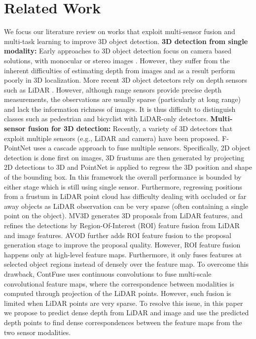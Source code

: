 \documentclass[10pt,twocolumn,letterpaper]{article}
\newcommand{\bd}[1]{\textbf{#1}}
\begin{document}
 \section{Related Work}
We focus our literature review on works that exploit multi-sensor fusion and multi-task learning to improve 3D object detection.
\newline
\newline
\bd{3D detection from single modality:}
Early approaches to 3D object detection focus on camera based solutions, with monocular or stereo images \cite{3dop, mono3d}. However, they suffer from the inherent difficulties of estimating depth from images  and as a result  perform poorly in 3D localization. More recent  3D object detectors rely on depth sensors such as  LiDAR \cite{pixor, voxelnet}. However, although range sensors provide precise depth measurements,  the observations are usually  sparse (particularly at long range) and lack the information richness of  images. It is thus difficult to distinguish classes such as pedestrian and bicyclist with LiDAR-only detectors. 
\newline
\newline
\bd{Multi-sensor fusion for 3D detection:}
Recently, a variety of 3D detectors that exploit  multiple sensors (e.g., LiDAR and camera) have been proposed. 
F-PointNet \cite{fpointnet} uses a cascade approach to fuse multiple sensors. Specifically, 2D object detection is done first on images, 3D frustums are then generated by projecting 2D detections to 3D and PointNet \cite{pointnet, pointnet2} is applied to regress the 3D position and shape of the bounding box. In this framework the overall performance is bounded by either stage which is still using single sensor. Furthermore, regressing positions from a frustum in LiDAR point cloud has difficulty dealing with occluded or far away objects as LiDAR observation can be very sparse (often containing a single point on the object). 
MV3D \cite{mv3d} generates 3D proposals from LiDAR features, and refines the detections by Region-Of-Interest (ROI) feature fusion from LiDAR and image features. AVOD \cite{avod} further adds ROI feature fusion to the proposal generation stage to improve the proposal quality. However, ROI feature fusion happens only  at high-level feature maps. Furthermore,  it only fuses features at selected object regions instead of densely over the feature map. To overcome this drawback, ContFuse \cite{contfuse}  uses continuous convolutions to fuse multi-scale convolutional feature maps, where the  correspondence between modalities is computed through projection of the LiDAR points. However, such fusion is limited when LiDAR points are very sparse. To resolve this issue, in this paper we propose to predict dense depth from LiDAR and image and use the predicted depth points to find dense correspondences between the  feature maps from the two sensor modalities. 
\end{document}
